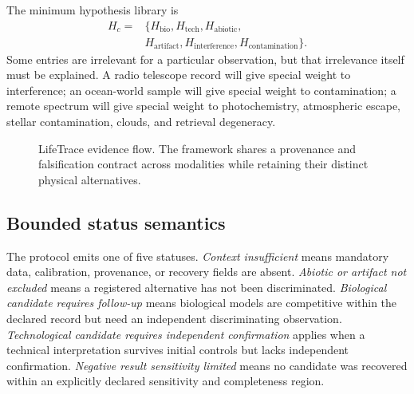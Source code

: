 \documentclass[conference]{IEEEtran}
\begin{document}
The minimum hypothesis library is
\begin{equation}
\begin{aligned}
 H_c={}&\{H_{\mathrm{bio}},H_{\mathrm{tech}},H_{\mathrm{abiotic}},\\
 &H_{\mathrm{artifact}},H_{\mathrm{interference}},H_{\mathrm{contamination}}\}.
\end{aligned}
\label{eq:hypotheses}
\end{equation}
Some entries are irrelevant for a particular observation, but that irrelevance itself must be explained. A radio telescope record will give special weight to interference; an ocean-world sample will give special weight to contamination; a remote spectrum will give special weight to photochemistry, atmospheric escape, stellar contamination, clouds, and retrieval degeneracy.

\begin{figure}[t]
\centering
{}
\caption{LifeTrace evidence flow. The framework shares a provenance and falsification contract across modalities while retaining their distinct physical alternatives.}
\label{fig:lifetrace}
\end{figure}

\subsection{Bounded status semantics}

The protocol emits one of five statuses. \emph{Context insufficient} means mandatory data, calibration, provenance, or recovery fields are absent. \emph{Abiotic or artifact not excluded} means a registered alternative has not been discriminated. \emph{Biological candidate requires follow-up} means biological models are competitive within the declared record but need an independent discriminating observation. \emph{Technological candidate requires independent confirmation} applies when a technical interpretation survives initial controls but lacks independent confirmation. \emph{Negative result sensitivity limited} means no candidate was recovered within an explicitly declared sensitivity and completeness region.
\end{document}
